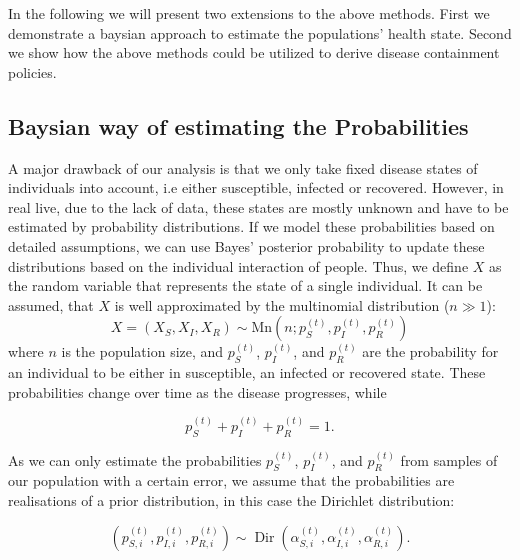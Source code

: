 

In the following we will present two extensions to the above methods.
First we demonstrate a baysian approach to estimate the populations' health state.
Second we show how the above methods could be utilized to derive disease containment policies.

\subsection{Baysian way of estimating the Probabilities}

A major drawback of our analysis is that we only take fixed disease states of individuals into account, i.e either susceptible, infected or recovered. However, in real live, due to the lack of data, these states are mostly unknown and have to be estimated by probability distributions. If we model these probabilities based on detailed assumptions, we can use Bayes' posterior probability to update these distributions based on the individual interaction of people. Thus, we define $X$ as the random variable that represents the state of a single individual. It can be assumed, that $X$ is well approximated by the multinomial distribution ($n\gg1$):
\begin{equation}
    X = \left(X_{S}, X_{I}, X_{R}\right) \sim \text{Mn}(n;p_S^{(t)},p_I^{(t)},p_R^{(t)})
\end{equation}
where $n$ is the population size, and $p_S^{(t)}$, $p_I^{(t)}$, and $p_R^{(t)}$ are the probability for an individual to be either in susceptible, an infected or recovered state. These probabilities change over time as the disease progresses, while

\begin{equation}
    p_S^{(t)}+p_I^{(t)}+p_R^{(t)}=1.
\end{equation}

As we can only estimate the probabilities $p_S^{(t)}$, $p_I^{(t)}$, and $p_R^{(t)}$ from samples of our population with a certain error, we assume that the probabilities are realisations of a prior distribution, in this case the Dirichlet distribution:

\begin{equation}
    \left(p_{S,i}^{(t)}, p_{I,i}^{(t)}, p_{R,i}^{(t)}\right) \sim \operatorname{Dir}\left(\alpha_{S,i}^{(t)}, \alpha_{I,i}^{(t)}, \alpha_{R,i}^{(t)}\right).
\end{equation}

